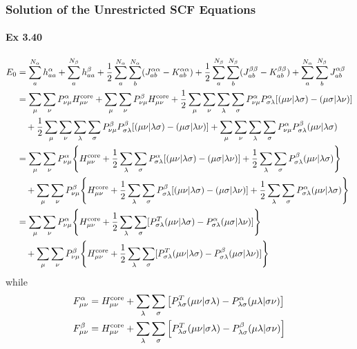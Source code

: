 \documentclass[a4paper]{article}
\DeclareMathOperator{\core}{\mathrm{core}}
\newcommand{\ex}[1]{\paragraph{Ex #1}}
\numberwithin{equation}{subsection}
\begin{document}
\subsubsection{Solution of the Unrestricted SCF Equations}
\ex{3.40}
\begin{align}
E_0 &= \sum_a^{N_\alpha} h_{aa}^\alpha + \sum_a^{N_\beta} h_{aa}^\beta + \dfrac{1}{2}\sum_a^{N_\alpha}\sum_b^{N_\alpha} (J_{ab}^{\alpha\alpha} - K_{ab}^{\alpha\alpha}) + \dfrac{1}{2}\sum_a^{N_\beta}\sum_b^{N_\beta} (J_{ab}^{\beta\beta} - K_{ab}^{\beta\beta}) 
+ \sum_a^{N_\alpha}\sum_b^{N_\beta} J_{ab}^{\alpha\beta} \notag\\
&= \sum_\mu\sum_\nu P^\alpha_{\nu\mu}H^{\core}_{\mu\nu} + \sum_\mu\sum_\nu P^\beta_{\nu\mu}H^{\core}_{\mu\nu} + \dfrac{1}{2}\sum_\mu\sum_\nu\sum_\lambda\sum_\sigma P^\alpha_{\nu\mu}P^\alpha_{\sigma\lambda} [(\mu\nu|\lambda\sigma) - (\mu\sigma|\lambda\nu)] \notag\\
&\quad{} + \dfrac{1}{2}\sum_\mu\sum_\nu\sum_\lambda\sum_\sigma P^\beta_{\nu\mu}P^\beta_{\sigma\lambda} [(\mu\nu|\lambda\sigma) - (\mu\sigma|\lambda\nu)] + \sum_\mu\sum_\nu\sum_\lambda\sum_\sigma P^\alpha_{\nu\mu}P^\beta_{\sigma\lambda} (\mu\nu|\lambda\sigma) \notag\\
&= \sum_\mu\sum_\nu P^\alpha_{\nu\mu} \qty{H^{\core}_{\mu\nu} + \dfrac{1}{2}\sum_\lambda\sum_\sigma P^\alpha_{\sigma\lambda} [(\mu\nu|\lambda\sigma) - (\mu\sigma|\lambda\nu)] 
+ \dfrac{1}{2}\sum_\lambda\sum_\sigma P^\beta_{\sigma\lambda} (\mu\nu|\lambda\sigma)}      \notag\\
&\quad{} + \sum_\mu\sum_\nu P^\beta_{\nu\mu} \qty{ H^{\core}_{\mu\nu} + \dfrac{1}{2}\sum_\lambda\sum_\sigma P^\beta_{\sigma\lambda} [(\mu\nu|\lambda\sigma) - (\mu\sigma|\lambda\nu)] 
+ \dfrac{1}{2}\sum_\lambda\sum_\sigma P^\alpha_{\sigma\lambda}(\mu\nu|\lambda\sigma)} \notag\\
&= \sum_\mu\sum_\nu P^\alpha_{\nu\mu} \qty{H^{\core}_{\mu\nu} + \dfrac{1}{2}\sum_\lambda\sum_\sigma [P^T_{\sigma\lambda} (\mu\nu|\lambda\sigma) - P^\alpha_{\sigma\lambda}(\mu\sigma|\lambda\nu)] }      \notag\\
&\quad{} + \sum_\mu\sum_\nu P^\beta_{\nu\mu} \qty{H^{\core}_{\mu\nu} + \dfrac{1}{2}\sum_\lambda\sum_\sigma [P^T_{\sigma\lambda} (\mu\nu|\lambda\sigma) - P^\beta_{\sigma\lambda}(\mu\sigma|\lambda\nu)] } \notag\\
\end{align}
while
\begin{align}
F^\alpha_{\mu\nu} &= H^{\core}_{\mu\nu} + \sum_\lambda\sum_\sigma \qty[ P^T_{\lambda\sigma}(\mu\nu|\sigma\lambda) - P^\alpha_{\lambda\sigma}(\mu\lambda|\sigma\nu)] \\
F^\beta_{\mu\nu} &= H^{\core}_{\mu\nu} + \sum_\lambda\sum_\sigma \qty[ P^T_{\lambda\sigma}(\mu\nu|\sigma\lambda) - P^\beta_{\lambda\sigma}(\mu\lambda|\sigma\nu)]
\end{align}
\end{document}

